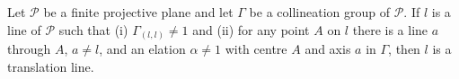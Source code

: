 Let $\mathcal{P}$ be a finite projective plane and let $\Gamma$ be a collineation group of $\mathcal{P}$. If $l$ is a line of $\mathcal{P}$ such that (i) $\Gamma_{(l, l)} \neq 1$ and (ii) for any point $A$ on $l$ there is a line $a$ through $A$, $a \neq l$, and an elation $\alpha \neq 1$ with centre $A$ and axis $a$ in $\Gamma$, then $l$ is a translation line.
